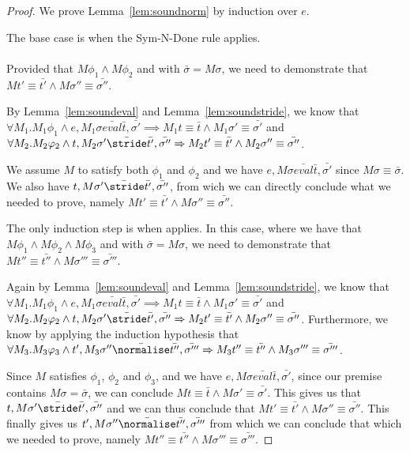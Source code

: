 \begin{proof}
  We prove Lemma~\ref{lem:soundnorm} by induction over $e$.

  The base case is when the Sym-N-Done rule applies.\\
  \\

  Provided that $M\phi_1\land M\phi_2$ and  with $\bar{\sigma}=M\sigma$,
  we need to demonstrate that $M t'\equiv \bar{t'}\land M\sigma''\equiv \bar{\sigma''}$.

  By Lemma~\ref{lem:soundeval} and Lemma~\ref{lem:soundstride},
  we know that
  $\forall M_1. M_1\phi_1 \land e,M_1\sigma \bar{eval}\bar{t},\bar{\sigma'}\implies M_1 t \equiv \bar{t} \land M_1 \sigma'\equiv \bar{\sigma'}$ and
  $\forall M_2.M_2\phi_2\land t,M_2\sigma'\bar{\stride}\bar{t'},\bar{\sigma''}\implies M_2 t'\equiv\bar{t'}\land M_2\sigma''\equiv \bar{\sigma''}$.

  We assume $M$ to satisfy both $\phi_1$ and $\phi_2$ and we have $e,M\sigma \bar{eval}\bar{t},\bar{\sigma'}$ since $M\sigma\equiv \bar{\sigma}$.
  We also have $t,M\sigma'\bar{\stride}\bar{t'},\bar{\sigma''}$,
  from wich we can directly conclude what we needed to prove,
  namely $M t'\equiv \bar{t'}\land M\sigma''\equiv \bar{\sigma''}$.

  The only induction step is when  applies.
  In this case, where we have that $M\phi_1\land M\phi_2 \land M\phi_3$ and  with $\bar{\sigma}=M\sigma$,
  we need to demonstrate that $M t''\equiv \bar{t''}\land M\sigma'''\equiv \bar{\sigma'''}$.

  Again by Lemma~\ref{lem:soundeval} and Lemma~\ref{lem:soundstride},
  we know that
  $\forall M_1. M_1\phi_1 \land e,M_1\sigma \bar{eval}\bar{t},\bar{\sigma'}\implies M_1 t \equiv \bar{t} \land M_1 \sigma'\equiv \bar{\sigma'}$ and
  $\forall M_2.M_2\phi_2\land t,M_2\sigma'\bar{\stride}\bar{t'},\bar{\sigma''}\implies M_2 t'\equiv\bar{t'}\land M_2\sigma''\equiv \bar{\sigma''}$.
  Furthermore, we know by applying the induction hypothesis that $\forall M_3.M_3\phi_3 \land t',M_3\sigma''\bar{\normalise} \bar{t''},\bar{\sigma'''}\implies M_3 t''\equiv \bar{t''}\land M_3 \sigma'''\equiv \bar{\sigma'''}$.

  Since $M$ satisfies $\phi_1$, $\phi_2$ and $\phi_3$, and we have $e,M\sigma \bar{eval}\bar{t},\bar{\sigma'}$, since our premise contains $M\sigma = \bar{\sigma}$, we can conclude $M t \equiv \bar{t} \land M \sigma'\equiv \bar{\sigma'}$.
  This gives us that $t,M\sigma'\bar{\stride}\bar{t'},\bar{\sigma''}$ and we can thus conclude that $M t'\equiv\bar{t'}\land M\sigma''\equiv \bar{\sigma''}$.
  This finally gives us $t',M\sigma''\bar{\normalise} \bar{t''},\bar{\sigma'''}$ from which we can conclude that which we needed to prove,
  namely $M t''\equiv \bar{t''}\land M\sigma'''\equiv \bar{\sigma'''}$.
\end{proof}

